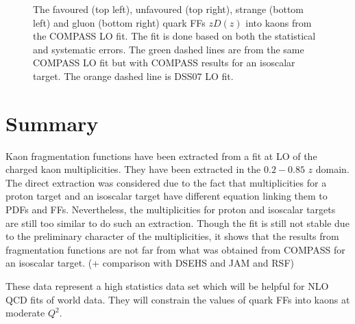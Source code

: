 \begin{figure}[!h]
	\caption{The favoured (top left), unfavoured (top right), strange (bottom left) and gluon (bottom right) quark FFs $zD(z)$ into kaons from the COMPASS LO fit. The fit is done based on both the statistical and systematic errors. The green dashed lines are from the same COMPASS LO fit but with COMPASS results for an isoscalar target. The orange dashed line is DSS$07$ LO fit.}
	\label{pic:FFFit}
\end{figure}


\newpage

\section{Summary}

Kaon fragmentation functions have been extracted from a fit at LO of the charged kaon multiplicities. They have been extracted in the $0.2-0.85$ $z$ domain. The direct extraction was considered due to the fact that multiplicities for a proton target and an isoscalar target have different equation linking them to PDFs and FFs. Nevertheless, the multiplicities for proton and isoscalar targets are still too similar to do such an extraction. Though the fit is still not stable due to the preliminary character of the multiplicities, it shows that the results from fragmentation functions are not far from what was obtained from COMPASS for an isoscalar target. (+ comparison with DSEHS and JAM and RSF)

These data represent a high statistics data set which will be helpful for NLO QCD fits of world data. They will constrain the values of quark FFs into kaons at moderate $Q^2$.
